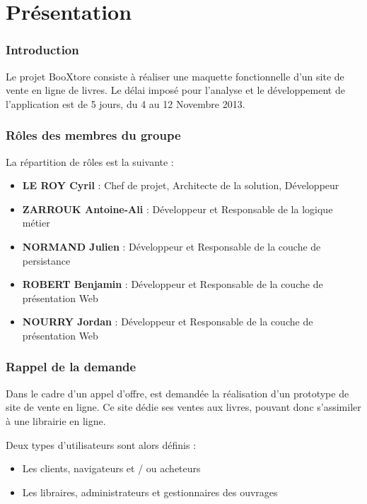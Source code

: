 \part{Présentation}
\section{Introduction}

	Le projet BooXtore consiste à réaliser une maquette fonctionnelle d'un site de vente en ligne de livres. Le délai imposé pour l'analyse et le développement de l'application est de 5 jours, du 4 au 12 Novembre 2013.

\section{Rôles des membres du groupe}

	La répartition de rôles est la suivante :
	\begin{itemize}
		\item \textbf{LE ROY Cyril} : Chef de projet, Architecte de la solution, Développeur
		\item \textbf{ZARROUK Antoine-Ali} : Développeur et Responsable de la logique métier
		\item \textbf{NORMAND Julien} : Développeur et Responsable de la couche de persistance
		\item \textbf{ROBERT Benjamin} : Développeur et Responsable de la couche de présentation Web
		\item \textbf{NOURRY Jordan} : Développeur et Responsable de la couche de présentation Web
	\end{itemize}

\section{Rappel de la demande}

	Dans le cadre d'un appel d'offre, est demandée la réalisation d'un prototype de site de vente en ligne. Ce site dédie ses ventes aux livres, pouvant donc s'assimiler à une librairie en ligne.

	Deux types d'utilisateurs sont alors définis :
	\begin{itemize}
		\item Les clients, navigateurs et / ou acheteurs
		\item Les libraires, administrateurs et gestionnaires des ouvrages
	\end{itemize}
